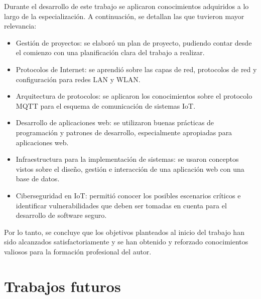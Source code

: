 
Durante el desarrollo de este trabajo se aplicaron conocimientos adquiridos a lo largo de la especialización. A continuación, se detallan las que tuvieron mayor relevancia:


\begin{itemize}
\item Gestión de proyectos: se elaboró un plan de proyecto, pudiendo contar desde el comienzo con una planificación clara del trabajo a realizar.

\item Protocolos de Internet: se aprendió sobre las capas de red, protocolos de red y configuración para redes LAN y WLAN. 

\item Arquitectura de protocolos: se aplicaron los conocimientos sobre el protocolo MQTT para el esquema de comunicación de sistemas IoT.

\item Desarrollo de aplicaciones web: se utilizaron buenas prácticas de programación y patrones de desarrollo, especialmente apropiadas para aplicaciones web. 

\item Infraestructura para la implementación de sistemas: se usaron conceptos vistos sobre el diseño, gestión e interacción de una aplicación web con una base de datos.

\item Ciberseguridad en IoT: permitió conocer los posibles escenarios críticos e identificar vulnerabilidades que deben ser tomadas en cuenta para el desarrollo de software seguro.

\end{itemize}

Por lo tanto, se concluye que los objetivos planteados al inicio del trabajo han sido alcanzados satisfactoriamente y se han obtenido y reforzado conocimientos valiosos para la formación profesional del autor.


\section{Trabajos futuros}

